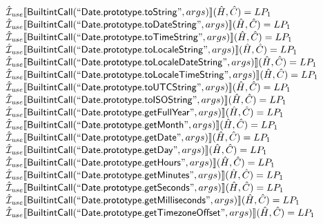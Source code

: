 \[
\begin{array}{l}

\hat{\mathcal{I}}_{\it use}\llbracket \mbox{\textsf{BuiltintCall}}(``\mbox{\textsf{Date.prototype.toString}}",args)\rrbracket(\hat{H},\hat{C}) = LP_1\\
\hat{\mathcal{I}}_{\it use}\llbracket \mbox{\textsf{BuiltintCall}}(``\mbox{\textsf{Date.prototype.toDateString}}",args)\rrbracket(\hat{H},\hat{C}) = LP_1\\
\hat{\mathcal{I}}_{\it use}\llbracket \mbox{\textsf{BuiltintCall}}(``\mbox{\textsf{Date.prototype.toTimeString}}",args)\rrbracket(\hat{H},\hat{C}) = LP_1\\
\hat{\mathcal{I}}_{\it use}\llbracket \mbox{\textsf{BuiltintCall}}(``\mbox{\textsf{Date.prototype.toLocaleString}}",args)\rrbracket(\hat{H},\hat{C}) = LP_1\\
\hat{\mathcal{I}}_{\it use}\llbracket \mbox{\textsf{BuiltintCall}}(``\mbox{\textsf{Date.prototype.toLocaleDateString}}",args)\rrbracket(\hat{H},\hat{C}) = LP_1\\
\hat{\mathcal{I}}_{\it use}\llbracket \mbox{\textsf{BuiltintCall}}(``\mbox{\textsf{Date.prototype.toLocaleTimeString}}",args)\rrbracket(\hat{H},\hat{C}) = LP_1\\
\hat{\mathcal{I}}_{\it use}\llbracket \mbox{\textsf{BuiltintCall}}(``\mbox{\textsf{Date.prototype.toUTCString}}",args)\rrbracket(\hat{H},\hat{C}) = LP_1\\
\hat{\mathcal{I}}_{\it use}\llbracket \mbox{\textsf{BuiltintCall}}(``\mbox{\textsf{Date.prototype.toISOString}}",args)\rrbracket(\hat{H},\hat{C}) = LP_1\\
\hat{\mathcal{I}}_{\it use}\llbracket \mbox{\textsf{BuiltintCall}}(``\mbox{\textsf{Date.prototype.getFullYear}}",args)\rrbracket(\hat{H},\hat{C}) = LP_1\\
\hat{\mathcal{I}}_{\it use}\llbracket \mbox{\textsf{BuiltintCall}}(``\mbox{\textsf{Date.prototype.getMonth}}",args)\rrbracket(\hat{H},\hat{C}) = LP_1\\
\hat{\mathcal{I}}_{\it use}\llbracket \mbox{\textsf{BuiltintCall}}(``\mbox{\textsf{Date.prototype.getDate}}",args)\rrbracket(\hat{H},\hat{C}) = LP_1\\
\hat{\mathcal{I}}_{\it use}\llbracket \mbox{\textsf{BuiltintCall}}(``\mbox{\textsf{Date.prototype.getDay}}",args)\rrbracket(\hat{H},\hat{C}) = LP_1\\
\hat{\mathcal{I}}_{\it use}\llbracket \mbox{\textsf{BuiltintCall}}(``\mbox{\textsf{Date.prototype.getHours}}",args)\rrbracket(\hat{H},\hat{C}) = LP_1\\
\hat{\mathcal{I}}_{\it use}\llbracket \mbox{\textsf{BuiltintCall}}(``\mbox{\textsf{Date.prototype.getMinutes}}",args)\rrbracket(\hat{H},\hat{C}) = LP_1\\
\hat{\mathcal{I}}_{\it use}\llbracket \mbox{\textsf{BuiltintCall}}(``\mbox{\textsf{Date.prototype.getSeconds}}",args)\rrbracket(\hat{H},\hat{C}) = LP_1\\
\hat{\mathcal{I}}_{\it use}\llbracket \mbox{\textsf{BuiltintCall}}(``\mbox{\textsf{Date.prototype.getMilliseconds}}",args)\rrbracket(\hat{H},\hat{C}) = LP_1\\
\hat{\mathcal{I}}_{\it use}\llbracket \mbox{\textsf{BuiltintCall}}(``\mbox{\textsf{Date.prototype.getTimezoneOffset}}",args)\rrbracket(\hat{H},\hat{C}) = LP_1\\

\end{array}\]
